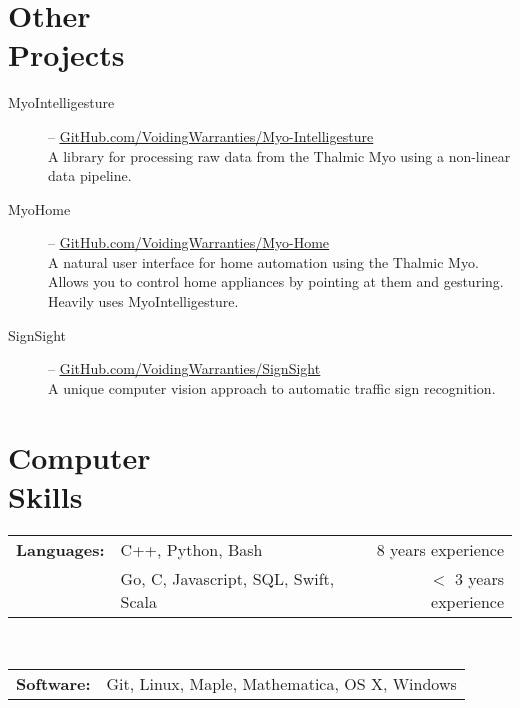 \documentclass[margin]{res}
\begin{document}
\begin{minipage}{\textwidth}
\begin{resume}
\section{Other \\ Projects}
\begin{description}
	\item[MyoIntelligesture] -- \uline{\href{http://GitHub.com/VoidingWarranties/Myo-Intelligesture}{GitHub.com/VoidingWarranties/Myo-Intelligesture}} \\
		A library for processing raw data from the Thalmic Myo using a non-linear data pipeline.
	\item[MyoHome] -- \uline{\href{http://GitHub.com/VoidingWarranties/Myo-Home}{GitHub.com/VoidingWarranties/Myo-Home}} \\
		A natural user interface for home automation using the Thalmic Myo. Allows you to control home appliances by pointing at them and gesturing. Heavily uses MyoIntelligesture.
	\item[SignSight] -- \uline{\href{http://GitHub.com/VoidingWarranties/SignSight}{GitHub.com/VoidingWarranties/SignSight}} \\
		A unique computer vision approach to automatic traffic sign recognition.
\end{description}

\section{Computer \\ Skills}
\begin{tabular}{l l r}
		{\bf Languages:} & C++, Python, Bash & 8 years experience \\
		                 & Go, C, Javascript, SQL, Swift, Scala & $<$ 3 years experience \\
\end{tabular} \\
\bgroup
\def\arraystretch{1.23} %
\begin{tabular}{l p{4in}}
		{\bf Software:} & Git, Linux, Maple, Mathematica, OS X, Windows \\
 \end{tabular}
\egroup


\end{resume}
\end{minipage}
\end{document}
